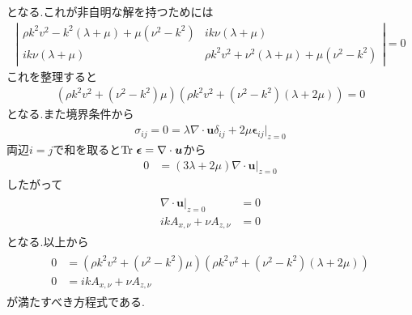 \documentclass[uplatex,a4j,11pt,dvipdfmx]{jsarticle}
\begin{document}
となる.これが非自明な解を持つためには
\begin{align}
  \left|
    \begin{array}{cc}
    \rho k^2v^2-k^2(\lambda+\mu)+\mu(\nu^2-k^2)&ik\nu(\lambda+\mu)\\
    ik\nu(\lambda+\mu)&\rho k^2v^2+\nu^2(\lambda+\mu)+\mu(\nu^2-k^2)
  \end{array}
  \right|=0
\end{align}
これを整理すると
\begin{align}
  \left(\rho k^2v^2+(\nu^2-k^2)\mu\right)\left(\rho k^2v^2+(\nu^2-k^2)(\lambda+2\mu)\right)=0
\end{align}
となる.また境界条件から
\begin{align}
  \sigma_{ij}=0=\lambda\nabla\cdot{\bm u}\delta_{ij}+2\mu{\bm \epsilon}_{ij}|_{z=0}
\end{align}
両辺$i=j$で和を取ると${\rm Tr}\ {\bm \epsilon}=\nabla\cdot{\bm u}$から
\begin{align}
    0&=(3\lambda+2\mu)\nabla\cdot{\bm u}|_{z=0}
\end{align}
したがって
\begin{align}
  \begin{split}
    \nabla\cdot{\bm u}|_{z=0}&=0\\
    ikA_{x,\nu}+\nu A_{z,\nu}&=0
  \end{split}
\end{align}
となる.以上から
\begin{align}
  \begin{split}
    0&=\left(\rho k^2v^2+(\nu^2-k^2)\mu\right)\left(\rho k^2v^2+(\nu^2-k^2)(\lambda+2\mu)\right)\\
    0&=ikA_{x,\nu}+\nu A_{z,\nu}
  \end{split}
\end{align}
が満たすべき方程式である.
\end{document}
